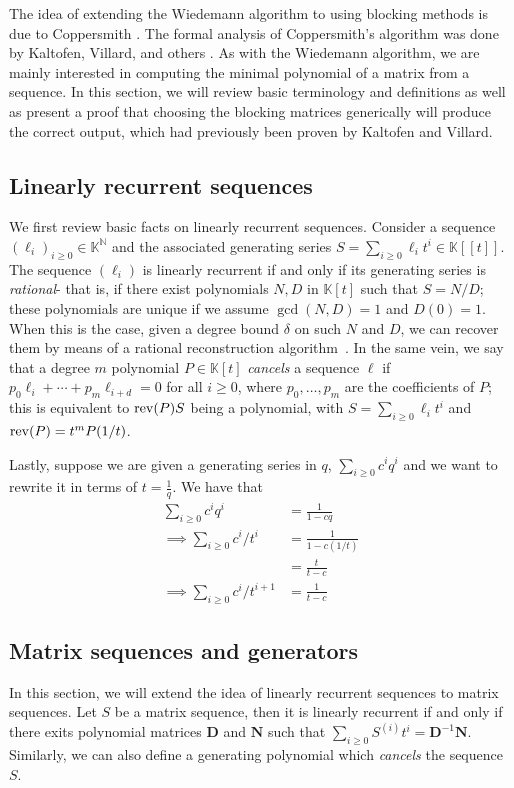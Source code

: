 \documentclass[12pt]{article}
\def\N {\ensuremath{\mathbb{N}}}
\def\K {\ensuremath{\mathbb{K}}}
\def\K{\mathbb{K}}
\def\mD{\mathbf{D}}
\def\mN{\mathbf{N}}
\begin{document}
The idea of extending the Wiedemann algorithm to using
blocking methods is due to Coppersmith \cite{Coppersmith93}.
The formal analysis of Coppersmith's algorithm was done by
Kaltofen, Villard, and others \cite{KaVi04}\cite{Villard97}.
As with the Wiedemann algorithm, we are mainly interested in
computing the minimal polynomial of a matrix from a sequence.
In this section, we will review basic terminology and definitions
as well as present a proof that choosing the blocking matrices 
generically will produce the correct output, 
which had previously been proven by Kaltofen and Villard.

\subsection{Linearly recurrent sequences}
We first review basic facts on linearly recurrent sequences.
Consider a sequence $(\ell_i)_{i \ge 0} \in \K^\N$
and the associated generating series $S=\sum_{i \ge 0} \ell_i t^i \in
\K[[t]]$. The sequence $(\ell_i)$ is {\rm linearly recurrent} if and
only if its generating series is {\em rational}- that is, if there
exist polynomials $N,D$ in $\K[t]$ such that $S=N/D$; these
polynomials are unique if we assume $\gcd(N,D)=1$ and $D(0)=1$. When
this is the case, given a degree bound $\delta$ on such $N$ and $D$,
we can recover them by means of a rational reconstruction
algorithm~\cite{GaGe13}. In the same vein, we say that a degree $m$
polynomial $P\in\K[t]$ {\em cancels} a sequence $\ell$ if $p_0 \ell_i
+ \cdots + p_m \ell_{i+d}=0$ for all $i \ge 0$, where $p_0,\dots,p_m$
are the coefficients of $P$; this is equivalent to ${\rm rev}(P) S$
being a polynomial, with $S=\sum_{i \ge 0} \ell_i t^i$ and ${\rm
	rev}(P)=t^m P(1/t)$.

Lastly, suppose we are given a generating series in $q$,
$\sum_{i\ge 0} c^i q^i$ and we want to rewrite it in terms
of $t = \frac{1}{q}$. We have that
\begin{align*}
	\sum_{i\ge0} c^i q^i &= \frac{1}{1-c q}\\
	\implies
	\sum_{i\ge0} c^i/ t^i &= \frac{1}{1-c (1/t)}\\
	&= \frac{t}{t-c}\\
	\implies
	\sum_{i\ge0} c^i/ t^{i+1} &= \frac{1}{t-c}
\end{align*}

\subsection{Matrix sequences and generators}
In this section, we will extend the idea of linearly recurrent
sequences to matrix sequences.
Let $S$ be a matrix sequence, then it is linearly recurrent
if and only if there exits polynomial matrices $\mD$ and $\mN$ such 
that $\sum_{i \ge 0} S^{(i)}t^i = \mD^{-1} \mN$.
Similarly, we can also define a generating polynomial which
\textit{cancels} the sequence $S$.
\end{document}
